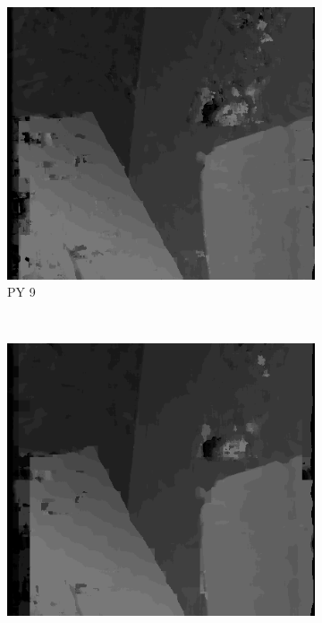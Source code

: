 \begin{figure}

  \begin{subfigure}[b]{0.23\textwidth}
    \centering
    \includegraphics[width=\textwidth]{images/stereo-pairs/venus_pyramid_9.png}
    \caption{PY 9}
  \end{subfigure}
  ~
  \begin{subfigure}[b]{0.23\textwidth}
    \centering
    \includegraphics[width=\textwidth]{images/stereo-pairs/venus_pyramid_13.png}

\end{subfigure}
\end{figure}
